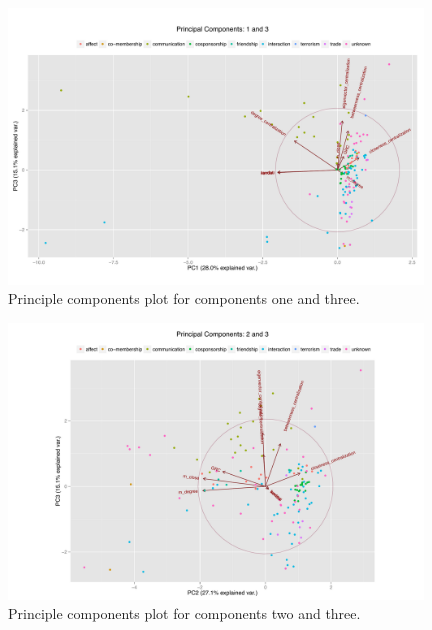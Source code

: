 \documentclass[3p,times]{elsarticle}
\begin{document}
\begin{figure}
\begin{center}
	\caption{\label{fig:1 and 3} Principle components plot for components one and three.}
		\includegraphics[width = 0.98\textwidth]{./images/Observed_PCA_Components1_3.pdf}
\end{center}
\end{figure}

\begin{figure}
\begin{center}
	\caption{\label{fig:2 and 3} Principle components plot for components two and three.}
		\includegraphics[width = 0.98\textwidth]{./images/Observed_PCA_Components2_3.pdf}
\end{center}
\end{figure}
\end{document}
